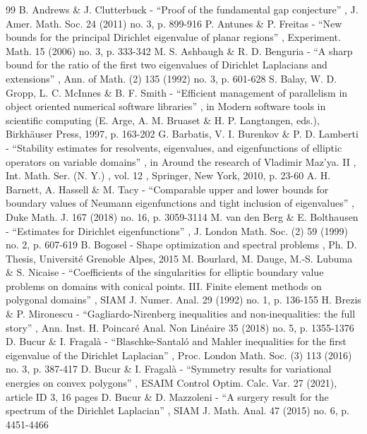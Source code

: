 \documentclass[11pt]{article}
\numberwithin{equation}{section}\newtheorem*{jepEnonce}{\jepEnonceTitle}\newenvironment{enonce*}[1]{\def\jepEnonceTitle{#1}\jepEnonce}{\endjepEnonce}\newtheorem*{conj*}{Conjecture}
\theoremstyle{plain}
\theoremstyle{definition}
\begin{document}
\begin{thebibliography}{99}
 B. Andrews \& J. Clutterbuck - “Proof of the fundamental gap conjecture” , J. Amer. Math. Soc. 24 (2011) no. 3, p. 899-916
 P. Antunes \& P. Freitas - “New bounds for the principal Dirichlet eigenvalue of planar regions” , Experiment. Math. 15 (2006) no. 3, p. 333-342
 M. S. Ashbaugh \& R. D. Benguria - “A sharp bound for the ratio of the first two eigenvalues of Dirichlet Laplacians and extensions” , Ann. of Math. (2) 135 (1992) no. 3, p. 601-628
 S. Balay, W. D. Gropp, L. C. McInnes \& B. F. Smith - “Efficient management of parallelism in object oriented numerical software libraries” , in Modern software tools in scientific computing (E. Arge, A. M. Bruaset \& H. P. Langtangen, eds.), Birkhäuser Press, 1997, p. 163-202
 G. Barbatis, V. I. Burenkov \& P. D. Lamberti - “Stability estimates for resolvents, eigenvalues, and eigenfunctions of elliptic operators on variable domains” , in Around the research of Vladimir Maz’ya. II , Int. Math. Ser. (N. Y.) , vol. 12 , Springer, New York, 2010, p. 23-60
 A. H. Barnett, A. Hassell \& M. Tacy - “Comparable upper and lower bounds for boundary values of Neumann eigenfunctions and tight inclusion of eigenvalues” , Duke Math. J. 167 (2018) no. 16, p. 3059-3114
 M. van den Berg \& E. Bolthausen - “Estimates for Dirichlet eigenfunctions” , J. London Math. Soc. (2) 59 (1999) no. 2, p. 607-619
 B. Bogosel - Shape optimization and spectral problems , Ph. D. Thesis, Université Grenoble Alpes, 2015
 M. Bourlard, M. Dauge, M.-S. Lubuma \& S. Nicaise - “Coefficients of the singularities for elliptic boundary value problems on domains with conical points. III. Finite element methods on polygonal domains” , SIAM J. Numer. Anal. 29 (1992) no. 1, p. 136-155
 H. Brezis \& P. Mironescu - “Gagliardo-Nirenberg inequalities and non-inequalities: the full story” , Ann. Inst. H. Poincaré Anal. Non Linéaire 35 (2018) no. 5, p. 1355-1376
 D. Bucur \& I. Fragalà - “Blaschke-Santaló and Mahler inequalities for the first eigenvalue of the Dirichlet Laplacian” , Proc. London Math. Soc. (3) 113 (2016) no. 3, p. 387-417
 D. Bucur \& I. Fragalà - “Symmetry results for variational energies on convex polygons” , ESAIM Control Optim. Calc. Var. 27 (2021), article ID 3, 16 pages
 D. Bucur \& D. Mazzoleni - “A surgery result for the spectrum of the Dirichlet Laplacian” , SIAM J. Math. Anal. 47 (2015) no. 6, p. 4451-4466

\end{thebibliography}
\end{document}
